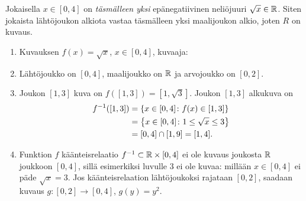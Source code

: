 \documentclass[11pt,a4paper]{amsart}
\begin{document}
\begin{solution}
Jokaisella \(x \in [0, 4]\) on \emph{täsmälleen yksi} epänegatiivinen
neliöjuuri \(\sqrt{x} \in \mathbb{R}\). Siten jokaista lähtöjoukon alkiota vastaa
täsmälleen yksi maalijoukon alkio, joten \(R\) on kuvaus.
\leavevmode\par
\begin{enumerate}[label=\alph*), nosep]
\item Kuvauksen \(f(x) = \sqrt{x}\), \(x \in [0, 4]\), kuvaaja:
\begin{center}
\end{center}
\item Lähtöjoukko on \([0, 4]\), maalijoukko on \(\mathbb{R}\) ja arvojoukko
on \([0, 2]\).
\item Joukon \([1, 3]\) kuva on \(f([1, 3]) = [1, \sqrt{3}]\). Joukon
\([1, 3]\) alkukuva on
\[
\begin{aligned}
f^{-1}([1, 3]) &= \left\lbrace x \in [0, 4] \colon f(x) \in [1, 3]\right\rbrace \\
&= \left\lbrace x \in [0, 4] \colon 1 \leq \sqrt{x} \leq 3\right\rbrace \\
&= [0, 4] \cap [1, 9] = [1, 4].
\end{aligned}
\]
\item Funktion \(f\) käänteisrelaatio \(f^{-1} \subset \mathbb{R} \times [0, 4]\)
ei ole kuvaus joukosta \(\mathbb{R}\) joukkoon \([0, 4]\), sillä esimerkiksi
luvulle \(3\) ei ole kuvaa: millään \(x \in [0, 4]\) ei päde
\(\sqrt{x} = 3\).
Jos käänteisrelaation lähtöjoukoksi rajataan \([0, 2]\), saadaan kuvaus
\(g \colon [0, 2] \to [0, 4]\), \(g(y) = y^2\).
\end{enumerate}
\end{solution}
\end{document}
